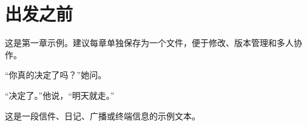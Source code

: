 \chapter{出发之前}

这是第一章示例。建议每章单独保存为一个文件，便于修改、版本管理和多人协作。

“你真的决定了吗？”她问。

“决定了。”他说，“明天就走。”

\begin{lettertext}
这是一段信件、日记、广播或终端信息的示例文本。
\end{lettertext}
